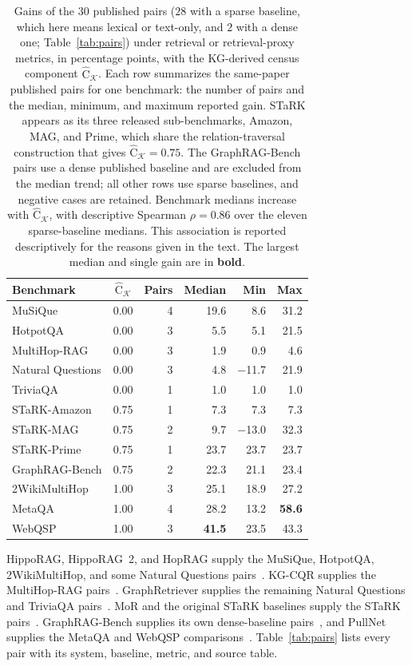 \documentclass[11pt]{article}
\newcommand{\Chat}{\widehat{\mathrm{C}}}
\newcommand{\kg}{\mathcal{K}}
\newcommand{\best}[1]{\textbf{#1}}          %
\begin{document}
\begin{table}[ht]\centering\footnotesize
\setlength{\tabcolsep}{4pt}
\begin{tabular}{lcrrrr}
\toprule
Benchmark & $\Chat_{\kg}$ & Pairs & Median & Min & Max\\
\midrule
MuSiQue & 0.00 & 4 & 19.6 & 8.6 & 31.2\\
HotpotQA & 0.00 & 3 & 5.5 & 5.1 & 21.5\\
MultiHop-RAG & 0.00 & 3 & 1.9 & 0.9 & 4.6\\
Natural Questions & 0.00 & 3 & 4.8 & $-$11.7 & 21.9\\
TriviaQA & 0.00 & 1 & 1.0 & 1.0 & 1.0\\
STaRK-Amazon & 0.75 & 1 & 7.3 & 7.3 & 7.3\\
STaRK-MAG & 0.75 & 2 & 9.7 & $-$13.0 & 32.3\\
STaRK-Prime & 0.75 & 1 & 23.7 & 23.7 & 23.7\\
GraphRAG-Bench & 0.75 & 2 & 22.3 & 21.1 & 23.4\\
2WikiMultiHop & 1.00 & 3 & 25.1 & 18.9 & 27.2\\
MetaQA & 1.00 & 4 & 28.2 & 13.2 & \best{58.6}\\
WebQSP & 1.00 & 3 & \best{41.5} & 23.5 & 43.3\\
\bottomrule
\end{tabular}
\caption{Gains of the $30$ published pairs ($28$ with a sparse baseline, which here means lexical or text-only, and $2$ with a dense one; Table~\ref{tab:pairs}) under retrieval or retrieval-proxy metrics, in percentage points, with the KG-derived census component $\Chat_{\kg}$. Each row summarizes the same-paper published pairs for one benchmark: the number of pairs and the median, minimum, and maximum reported gain. STaRK appears as its three released sub-benchmarks, Amazon, MAG, and Prime, which share the relation-traversal construction that gives $\Chat_{\kg}=0.75$. The GraphRAG-Bench pairs use a dense published baseline and are excluded from the median trend; all other rows use sparse baselines, and negative cases are retained. Benchmark medians increase with $\Chat_{\kg}$, with descriptive Spearman $\rho=0.86$ over the eleven sparse-baseline medians. This association is reported descriptively for the reasons given in the text. The largest median and single gain are in \best{bold}.}
\label{tab:scatter}
\end{table}
HippoRAG, HippoRAG~2, and HopRAG supply the MuSiQue, HotpotQA, 2WikiMultiHop, and some Natural Questions pairs~\citep{gutierrez2024hipporag,gutierrez2025hipporag2,liu2025hoprag}. KG-CQR supplies the MultiHop-RAG pairs~\citep{bui2025kgcqr}. GraphRetriever supplies the remaining Natural Questions and TriviaQA pairs~\citep{min2020knowledgeguided}. MoR and the original STaRK baselines supply the STaRK pairs~\citep{lei2025mor,wu2024stark}. GraphRAG-Bench supplies its own dense-baseline pairs~\citep{graphragbench2025}, and PullNet supplies the MetaQA and WebQSP comparisons~\citep{sun2019pullnet}. Table~\ref{tab:pairs} lists every pair with its system, baseline, metric, and source table.
\end{document}
